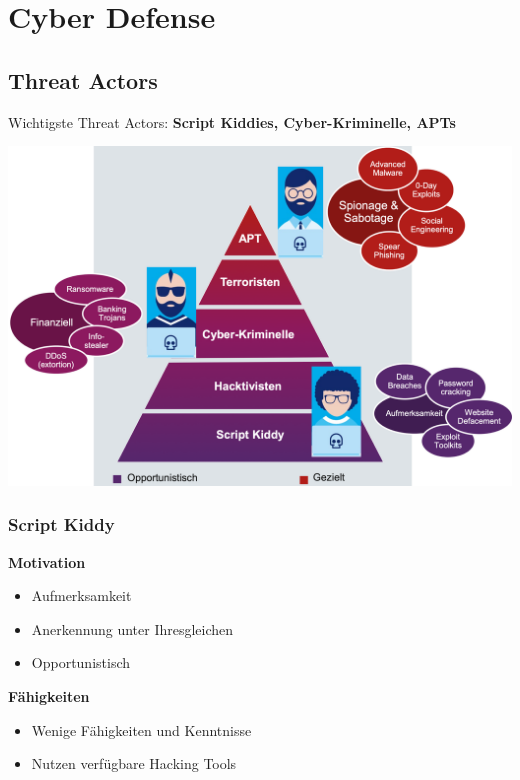 

\section{Cyber Defense}\label{sec:cyber-defense}

\subsection{Threat Actors}\label{subsec:threat-actors}
Wichtigste Threat Actors: \textbf{Script Kiddies, Cyber-Kriminelle, APTs}
\begin{center}
    \vspace{-8pt}
    \includegraphics[width=.8\linewidth]{./img/01_cyber-defense/threat_actors}
    \vspace{-8pt}
\end{center}


\subsubsection{Script Kiddy}
\vspace{-8pt}
\begin{multicols*}{2}
    \textbf{Motivation}
    \begin{itemize}
        \item Aufmerksamkeit
        \item Anerkennung unter Ihresgleichen
        \item Opportunistisch
    \end{itemize}
    \columnbreak
    \textbf{Fähigkeiten}
    \begin{itemize}
        \item Wenige Fähigkeiten und Kenntnisse
        \item Nutzen verfügbare Hacking Tools
    \end{itemize}
\end{multicols*}
\vspace{-8pt}


